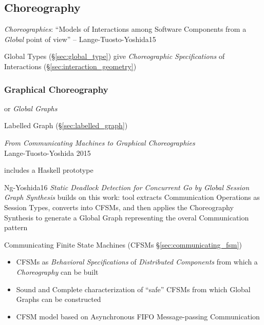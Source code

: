 \subsection{Choreography}\label{sec:choreography}

\emph{Choreographies}: ``Models of Interactions among Software
Components from a \emph{Global} point of view'' --
Lange-Tuosto-Yoshida15

\fist Global Types (\S\ref{sec:global_type}) give \emph{Choreographic
  Specifications} of Interactions (\S\ref{sec:interaction_geometry})



\subsubsection{Graphical Choreography}\label{sec:graphical_choreography}

or \emph{Global Graphs}

\fist Labelled Graph (\S\ref{sec:labelled_graph})

\begingroup

\newcommand{\party}{\mono}

\emph{From Communicating Machines to Graphical Choreographies} \\
Lange-Tuosto-Yoshida 2015

includes a Haskell prototype

Ng-Yoshida16 \emph{Static Deadlock Detection for Concurrent Go by
  Global Session Graph Synthesis} builds on this work: tool extracts
Communication Operations as Session Types, converts into CFSMs, and
then applies the Choreography Synthesis to generate a Global Graph
representing the overal Communication pattern

\fist Communicating Finite State Machines (CFSMs
\S\ref{sec:communicating_fsm})

\begin{itemize}
\item CFSMs as \emph{Behavioral Specifications} of \emph{Distributed
  Components} from which a \emph{Choreography} can be built
\item Sound and Complete characterization of ``safe'' CFSMs from which
  Global Graphs can be constructed
\item CFSM model based on Asynchronous FIFO Message-passing
  Communication
\end{itemize}

